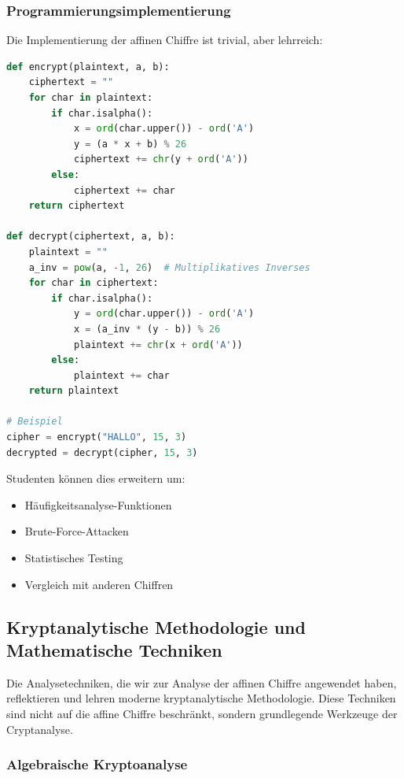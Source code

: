 ﻿\documentclass[12pt,a4paper]{article}
\begin{document}
	\subsubsection{Programmierungsimplementierung}
	
	Die Implementierung der affinen Chiffre ist trivial, aber lehrreich:
	
	\begin{lstlisting}[language=Python, caption=Affine Cipher in Python]
def encrypt(plaintext, a, b):
    ciphertext = ""
    for char in plaintext:
        if char.isalpha():
            x = ord(char.upper()) - ord('A')
            y = (a * x + b) % 26
            ciphertext += chr(y + ord('A'))
        else:
            ciphertext += char
    return ciphertext

def decrypt(ciphertext, a, b):
    plaintext = ""
    a_inv = pow(a, -1, 26)  # Multiplikatives Inverses
    for char in ciphertext:
        if char.isalpha():
            y = ord(char.upper()) - ord('A')
            x = (a_inv * (y - b)) % 26
            plaintext += chr(x + ord('A'))
        else:
            plaintext += char
    return plaintext

# Beispiel
cipher = encrypt("HALLO", 15, 3)
decrypted = decrypt(cipher, 15, 3)
	\end{lstlisting}
	
	Studenten können dies erweitern um:
	\begin{itemize}
		\item Häufigkeitsanalyse-Funktionen
		\item Brute-Force-Attacken
		\item Statistisches Testing
		\item Vergleich mit anderen Chiffren
	\end{itemize}
	
	
	\subsection{Kryptanalytische Methodologie und Mathematische Techniken}
	
	Die Analysetechniken, die wir zur Analyse der affinen Chiffre angewendet haben, reflektieren und lehren moderne kryptanalytische Methodologie. Diese Techniken sind nicht auf die affine Chiffre beschränkt, sondern grundlegende Werkzeuge der Cryptanalyse.
	
	\subsubsection{Algebraische Kryptoanalyse}
	
\end{document}

